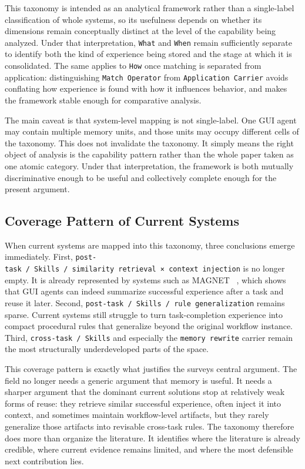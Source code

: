 \documentclass{article}
\begin{document}
This taxonomy is intended as an analytical framework rather than a
single-label classification of whole systems, so its usefulness depends
on whether its dimensions remain conceptually distinct at the level of
the capability being analyzed. Under that interpretation, \texttt{What}
and \texttt{When} remain sufficiently separate to identify both the kind
of experience being stored and the stage at which it is consolidated.
The same applies to \texttt{How} once matching is separated from
application: distinguishing \texttt{Match\ Operator} from
\texttt{Application\ Carrier} avoids conflating how experience is found
with how it influences behavior, and makes the framework stable enough
for comparative analysis.

The main caveat is that system-level mapping is not single-label. One
GUI agent may contain multiple memory units, and those units may occupy
different cells of the taxonomy. This does not invalidate the taxonomy.
It simply means the right object of analysis is the capability pattern
rather than the whole paper taken as one atomic category. Under that
interpretation, the framework is both mutually discriminative enough to
be useful and collectively complete enough for the present argument.

\subsection{Coverage Pattern of Current Systems}\label{45-coverage-pattern-of-current-systems}

When current systems are mapped into this taxonomy, three conclusions
emerge immediately. First,
\texttt{post-task\ /\ Skills\ /\ similarity\ retrieval\ ×\ context\ injection}
is no longer empty. It is already represented by systems such as MAGNET
~\parencite{sun2026magnetadaptiveguiagents}, which shows that GUI agents can indeed summarize
successful experience after a task and reuse it later. Second,
\texttt{post-task\ /\ Skills\ /\ rule\ generalization} remains sparse.
Current systems still struggle to turn task-completion experience into
compact procedural rules that generalize beyond the original workflow
instance. Third, \texttt{cross-task\ /\ Skills} and especially the
\texttt{memory\ rewrite} carrier remain the most structurally
underdeveloped parts of the space.

This coverage pattern is exactly what justifies the
survey\textquotesingle s central argument. The field no longer needs a
generic argument that memory is useful. It needs a sharper argument that
the dominant current solutions stop at relatively weak forms of reuse:
they retrieve similar successful experience, often inject it into
context, and sometimes maintain workflow-level artifacts, but they
rarely generalize those artifacts into revisable cross-task rules. The
taxonomy therefore does more than organize the literature. It identifies
where the literature is already credible, where current evidence remains
limited, and where the most defensible next contribution lies.
\end{document}
